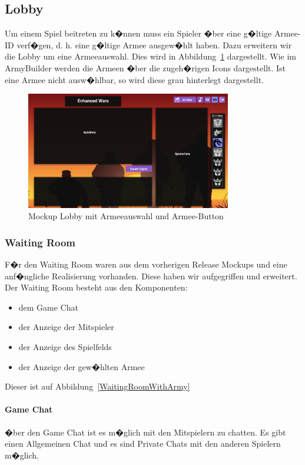 \documentclass[12pt, titlepage]{scrartcl}
\newcommand{\Abb}[1]{%
	Abbildung\ \ref{#1}%
}
\begin{document}
		\subsection{Lobby}
		Um einem Spiel beitreten zu k�nnen muss ein Spieler �ber eine g�ltige Armee-ID verf�gen, d. h. eine g�ltige Armee ausgew�hlt haben. Dazu erweitern wir die Lobby um eine Armeeauswahl. Dies wird in \Abb{Lobby_with_Army} dargestellt. Wie im ArmyBuilder werden die Armeen �ber die zugeh�rigen Icons dargestellt. Ist eine Armee nicht ausw�hlbar, so wird diese grau hinterlegt dargestellt. 
		\begin{figure}[H] 
			\centering
			\includegraphics[width=0.8\textwidth]{Lobby_mit_Army_Button_und_Armeeliste.png}
			\caption{Mockup Lobby mit Armeeauswahl und Armee-Button}
			\label{Lobby_with_Army}
		\end{figure}
		
		\subsubsection{Waiting Room}
		F�r den Waiting Room waren aus dem vorherigen Release Mockups und eine anf�ngliche Realisierung vorhanden. Diese haben wir aufgegriffen und erweitert. Der Waiting Room besteht aus den Komponenten:
		\begin{itemize}
			\item dem Game Chat
			\item der Anzeige der Mitspieler
			\item der Anzeige des Spielfelds
			\item der Anzeige der gew�hlten Armee
		\end{itemize}
		Dieser ist auf \Abb{WaitingRoomWithArmy}
		\paragraph{Game Chat}
		�ber den Game Chat ist es m�glich mit den Mitspielern zu chatten. Es gibt einen Allgemeinen Chat und es sind Private Chats mit den anderen Spielern m�glich.
\end{document}
